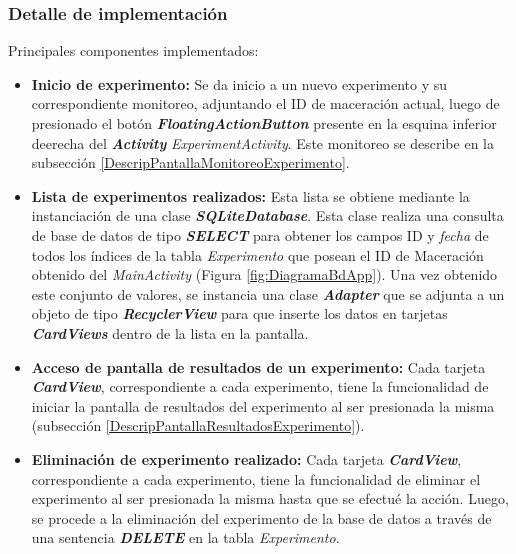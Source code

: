             \subsubsection{Detalle de implementación}
                \par Principales componentes implementados:
                \begin{itemize}
                    \item \textbf{Inicio de experimento:} Se da inicio a un nuevo experimento y su correspondiente monitoreo, adjuntando el ID de maceración actual, luego de presionado el botón \textbf{\textit{\gls{FloatingActionButton}}} presente en la esquina inferior deerecha del \textbf{\textit{Activity}} \textit{ExperimentActivity}. Este monitoreo se describe en la subsección \ref{DescripPantallaMonitoreoExperimento}.
                    
                    \item \textbf{Lista de experimentos realizados:} Esta lista se obtiene mediante la instanciación de una clase \textbf{\textit{\gls{SQLiteDatabase}}}. Esta clase realiza una consulta de base de datos de tipo \textbf{\textit{\gls{SELECT}}} para obtener los campos ID y \textit{fecha} de todos los índices de la tabla \textit{Experimento} que posean el ID de Maceración obtenido del \textit{MainActivity}  (Figura \ref{fig:DiagramaBdApp}). Una vez obtenido este conjunto de valores, se instancia una clase \textbf{\textit{\gls{Adapter}}} que se adjunta a un objeto de tipo \textbf{\textit{\gls{RecyclerView}}} para que inserte los datos en tarjetas \textbf{\textit{\gls{CardView}s}} dentro de la lista en la pantalla. 
                    
                    \item \textbf{Acceso de pantalla de resultados de un experimento:} Cada tarjeta \textbf{\textit{\gls{CardView}}}, correspondiente a cada experimento, tiene la funcionalidad de iniciar la pantalla de resultados del experimento al ser presionada la misma (subsección \ref{DescripPantallaResultadosExperimento}).
                  
                    \item \textbf{Eliminación de experimento realizado:} Cada tarjeta \textbf{\textit{\gls{CardView}}}, correspondiente a cada experimento, tiene la funcionalidad de eliminar el experimento al ser presionada la misma hasta que se efectué la acción. Luego, se procede a la eliminación del experimento de la base de datos a través de una sentencia \textbf{\textit{\gls{DELETE}}} en la tabla \textit{Experimento}.
                    

\end{itemize}
